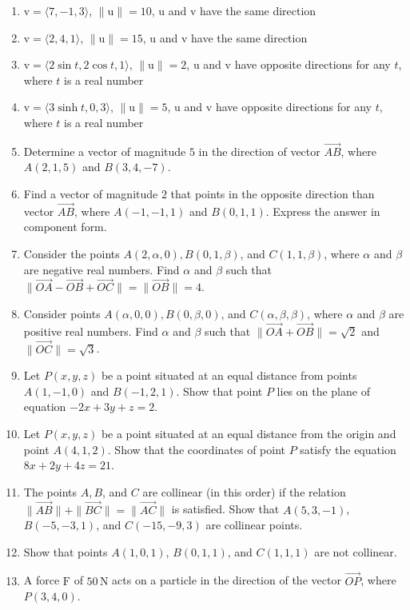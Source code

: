 \documentclass{exercises}
\begin{document}
\begin{enumerate}[resume]
\item $\text{v}=\langle7,-1,3\rangle$, $\|\text{u}\|=10$, $\text{u}$ and $\text{v}$ have the same direction
\item $\text{v}=\langle2,4,1\rangle$, $\|\text{u}\|=15$, $\text{u}$ and $\text{v}$ have the same direction
\item $\text{v}=\langle2\sin t,2\cos t,1\rangle$, $\|\text{u}\|=2$, $\text{u}$ and $\text{v}$ have opposite directions for any $t$, where $t$ is a real number
\item $\text{v}=\langle3\sinh t,0,3\rangle$, $\|\text{u}\|=5$, $\text{u}$ and $\text{v}$ have opposite directions for any $t$, where $t$ is a real number
\item Determine a vector of magnitude $5$ in the direction of vector $\overset{\to}{AB}$, where $A(2,1,5)$ and $B(3,4,-7)$.
\item Find a vector of magnitude $2$ that points in the opposite direction than vector $\overset{\to}{AB}$, where $A(-1,-1,1)$ and $B(0,1,1)$. Express the answer in component form.
\item Consider the points $A(2,\alpha,0),B(0,1,\beta)$, and $C(1,1,\beta)$, where $\alpha$ and $\beta$ are negative real numbers. Find $\alpha$ and $\beta$ such that $\|\overset{\to}{OA}-\overset{\to}{OB}+\overset{\to}{OC}\|=\|\overset{\to}{OB}\|=4$.
\item Consider points $A(\alpha,0,0),B(0,\beta,0)$, and $C(\alpha,\beta,\beta)$, where $\alpha$ and $\beta$ are positive real numbers. Find $\alpha$ and $\beta$ such that $\|\overset{\to}{OA}+\overset{\to}{OB}\|=\sqrt{2}$ and $\|\overset{\to}{OC}\|=\sqrt{3}$.
\item Let $P(x,y,z)$ be a point situated at an equal distance from points $A(1,-1,0)$ and $B(-1,2,1)$. Show that point $P$ lies on the plane of equation $-2x+3y+z=2$.
\item Let $P(x,y,z)$ be a point situated at an equal distance from the origin and point $A(4,1,2)$. Show that the coordinates of point $P$ satisfy the equation $8x+2y+4z=21$.
\item The points $A,B$, and $C$ are collinear (in this order) if the relation $\|\overset{\to}{AB}\|+\|\overset{\to}{BC}\|=\|\overset{\to}{AC}\|$ is satisfied. Show that $A(5,3,-1)$, $B(-5,-3,1)$, and $C(-15,-9,3)$ are collinear points.
\item Show that points $A(1,0,1)$, $B(0,1,1)$, and $C(1,1,1)$ are not collinear.
\item \techrequired A force $\text{F}$ of $50\,\text{N}$ acts on a particle in the direction of the vector $\overset{\to}{OP}$, where $P(3,4,0)$.

\end{enumerate}
\end{document}
